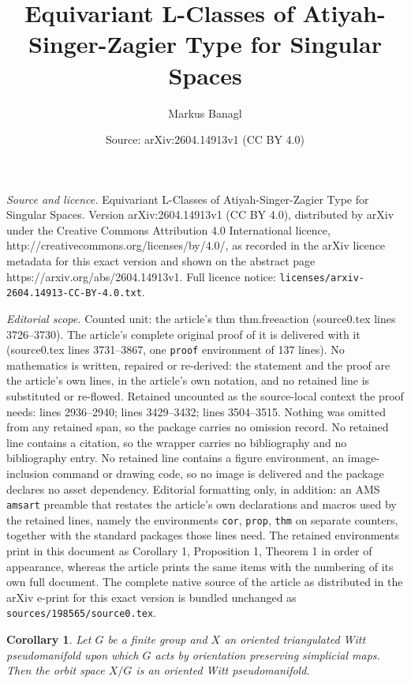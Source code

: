 \documentclass[10pt,a4paper]{amsart}
\title{Equivariant L-Classes of Atiyah-Singer-Zagier Type for Singular Spaces}
\author{Markus Banagl}
\date{Source: arXiv:2604.14913v1 (CC BY 4.0)}
\newtheorem{cor}{Corollary}
\begin{document}
\maketitle

\noindent\emph{Source and licence.} Equivariant L-Classes of Atiyah-Singer-Zagier Type for Singular Spaces. Version arXiv:2604.14913v1 (CC BY 4.0), distributed by arXiv under the Creative Commons Attribution 4.0 International licence, http://creativecommons.org/licenses/by/4.0/, as recorded in the arXiv licence metadata for this exact version and shown on the abstract page https://arxiv.org/abs/2604.14913v1. Full licence notice: \texttt{licenses/arxiv-2604.14913-CC-BY-4.0.txt}.\par\smallskip

\noindent\textit{Editorial scope.} Counted unit: the article's thm thm.freeaction (source0.tex lines 3726--3730). The article's complete original proof of it is delivered with it (source0.tex lines 3731--3867, one \texttt{proof} environment of 137 lines). No mathematics is written, repaired or re-derived: the statement and the proof are the article's own lines, in the article's own notation, and no retained line is substituted or re-flowed.  Retained uncounted as the source-local context the proof needs: lines 2936--2940; lines 3429--3432; lines 3504--3515.  Nothing was omitted from any retained span, so the package carries no omission record.  No retained line contains a citation, so the wrapper carries no bibliography and no bibliography entry.  No retained line contains a figure environment, an image-inclusion command or drawing code, so no image is delivered and the package declares no asset dependency.  Editorial formatting only, in addition: an AMS \texttt{amsart} preamble that restates the article's own declarations and macros used by the retained lines, namely the environments \texttt{cor}, \texttt{prop}, \texttt{thm} on separate counters, together with the standard packages those lines need.  The retained environments print in this document as Corollary 1, Proposition 1, Theorem 1 in order of appearance, whereas the article prints the same items with the numbering of its own full document.  The complete native source of the article as distributed in the arXiv e-print for this exact version is bundled unchanged as \texttt{sources/198565/source0.tex}.
\begin{cor} \label{cor.orbitspaceiswitt}
Let $G$ be a finite group and $X$ an oriented triangulated Witt pseudomanifold
upon which $G$ acts by orientation preserving simplicial maps.
Then the orbit space $X/G$ is an oriented Witt pseudomanifold.
\end{cor}
\end{document}
